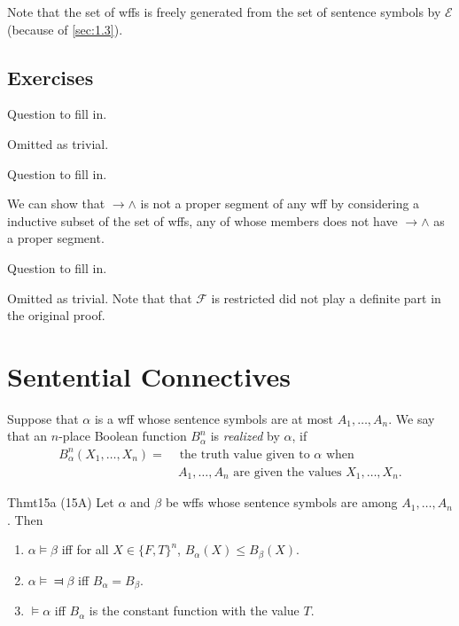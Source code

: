 Note that the set of wffs is freely generated from the set of sentence symbols by $\mathcal{E}$ (because of \ref{sec:1.3}).

\subsection*{Exercises}

\begin{exercise}
  Question to fill in.
\end{exercise}

Omitted as trivial.

\begin{exercise}
  Question to fill in.
\end{exercise}

We can show that $\rightarrow\wedge$ is not a proper segment of any wff by considering a inductive subset of the set of wffs, any of whose members does not have $\rightarrow\wedge$ as a proper segment.

\begin{exercise}
  Question to fill in.
\end{exercise}

Omitted as trivial. Note that that $\mathcal{F}$ is restricted did not play a definite part in the original proof.

\section{Sentential Connectives}

Suppose that $\alpha$ is a wff whose sentence symbols are at most $A_1,\dots,A_n$. We say that an $n$-place Boolean function $B_\alpha^n$ is \textit{realized} by $\alpha$, if
\begin{align*}
  B_{\alpha}^n(X_1,\dots,X_n)= & \text{ the truth value given to $\alpha$ when}             \\
                               & \ A_1,\dots,A_n\text{ are given the values }X_1,\dots,X_n.
\end{align*}

\begin{reference}{Thm}{t15a}
  (15A) Let $\alpha$ and $\beta$ be wffs whose sentence symbols are among $A_1,\dots,A_n$. Then
  \begin{enumerate}
    \item $\alpha\vDash \beta$ iff for all $X\in\{F,T\}^n$, $B_{\alpha}(X)\leq B_{\beta}(X)$.
    \item $\alpha\vDash\Dashv \beta$ iff $B_{\alpha}=B_{\beta}$.
    \item $\vDash \alpha$ iff $B_{\alpha}$ is the constant function with the value $T$.\qedhere
  \end{enumerate}
\end{reference}

